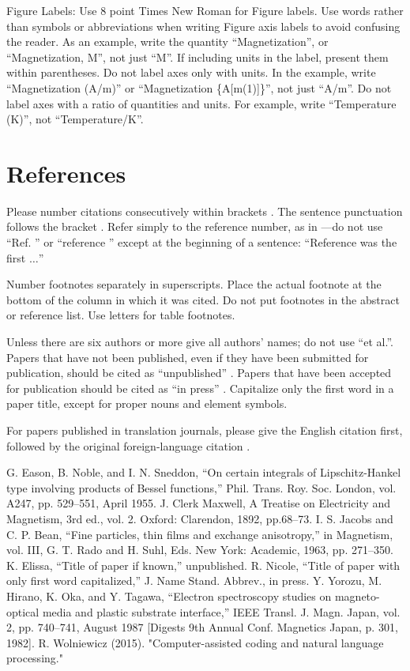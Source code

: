 \documentclass[conference]{IEEEtran}
\begin{document}
Figure Labels: Use 8 point Times New Roman for Figure labels. Use words 
rather than symbols or abbreviations when writing Figure axis labels to 
avoid confusing the reader. As an example, write the quantity 
``Magnetization'', or ``Magnetization, M'', not just ``M''. If including 
units in the label, present them within parentheses. Do not label axes only 
with units. In the example, write ``Magnetization (A/m)'' or ``Magnetization 
\{A[m(1)]\}'', not just ``A/m''. Do not label axes with a ratio of 
quantities and units. For example, write ``Temperature (K)'', not 
``Temperature/K''.

\section*{References}

Please number citations consecutively within brackets \cite{b1}. The 
sentence punctuation follows the bracket \cite{b2}. Refer simply to the reference 
number, as in \cite{b3}---do not use ``Ref. \cite{b3}'' or ``reference \cite{b3}'' except at 
the beginning of a sentence: ``Reference \cite{b3} was the first $\ldots$''

Number footnotes separately in superscripts. Place the actual footnote at 
the bottom of the column in which it was cited. Do not put footnotes in the 
abstract or reference list. Use letters for table footnotes.

Unless there are six authors or more give all authors' names; do not use 
``et al.''. Papers that have not been published, even if they have been 
submitted for publication, should be cited as ``unpublished'' \cite{b4}. Papers 
that have been accepted for publication should be cited as ``in press'' \cite{b5}. 
Capitalize only the first word in a paper title, except for proper nouns and 
element symbols.

For papers published in translation journals, please give the English 
citation first, followed by the original foreign-language citation \cite{b6}.

\begin{thebibliography}{00}
 G. Eason, B. Noble, and I. N. Sneddon, ``On certain integrals of Lipschitz-Hankel type involving products of Bessel functions,'' Phil. Trans. Roy. Soc. London, vol. A247, pp. 529--551, April 1955.
 J. Clerk Maxwell, A Treatise on Electricity and Magnetism, 3rd ed., vol. 2. Oxford: Clarendon, 1892, pp.68--73.
 I. S. Jacobs and C. P. Bean, ``Fine particles, thin films and exchange anisotropy,'' in Magnetism, vol. III, G. T. Rado and H. Suhl, Eds. New York: Academic, 1963, pp. 271--350.
 K. Elissa, ``Title of paper if known,'' unpublished.
 R. Nicole, ``Title of paper with only first word capitalized,'' J. Name Stand. Abbrev., in press.
 Y. Yorozu, M. Hirano, K. Oka, and Y. Tagawa, ``Electron spectroscopy studies on magneto-optical media and plastic substrate interface,'' IEEE Transl. J. Magn. Japan, vol. 2, pp. 740--741, August 1987 [Digests 9th Annual Conf. Magnetics Japan, p. 301, 1982].
 R. Wolniewicz (2015). "Computer-assisted coding and natural language processing."
\end{thebibliography}
\end{document}
